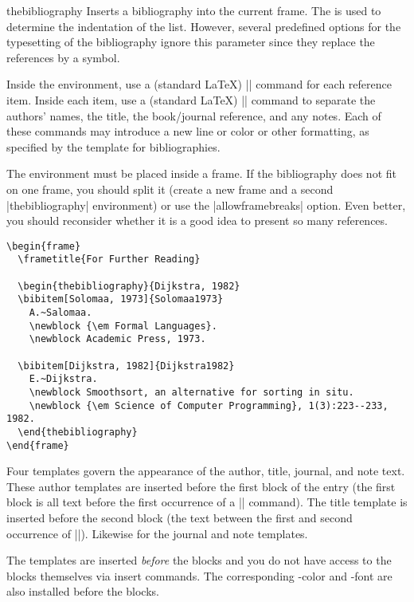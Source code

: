\begin{environment}{{thebibliography}}
  Inserts a bibliography into the current frame. The  is used to determine the indentation of the list. However,
  several predefined options for the typesetting of the bibliography
  ignore this parameter since they replace the references by a symbol.

  Inside the environment, use a (standard \LaTeX) |\bibitem| command
  for each reference item. Inside each item, use a (standard \LaTeX)
  |\newblock| command to separate the authors' names, the title, the
  book/journal reference, and any notes. Each of these commands may
  introduce a new line or color or other formatting, as specified by
  the template for bibliographies.

  The environment must be placed inside a frame. If the bibliography
  does not fit on one frame, you should
  split it (create a new frame and a second |thebibliography|
  environment) or use the |allowframebreaks| option. Even better, you
  should reconsider whether it is a good idea to present so many
  references.
  \example
\begin{verbatim}
\begin{frame}
  \frametitle{For Further Reading}

  \begin{thebibliography}{Dijkstra, 1982}
  \bibitem[Solomaa, 1973]{Solomaa1973}
    A.~Salomaa.
    \newblock {\em Formal Languages}.
    \newblock Academic Press, 1973.

  \bibitem[Dijkstra, 1982]{Dijkstra1982}
    E.~Dijkstra.
    \newblock Smoothsort, an alternative for sorting in situ.
    \newblock {\em Science of Computer Programming}, 1(3):223--233, 1982.
  \end{thebibliography}
\end{frame}
\end{verbatim}

  Four templates govern the appearance of the author, title, journal,
  and note text. These author templates are inserted before the first block
  of the entry (the first block is all text before the first occurrence of a
  |\newblock| command). The title template is inserted before
  the second block (the text between the first and second occurrence
  of |\newblock|). Likewise for the journal and note templates.

  The templates are inserted \emph{before} the blocks and you do not
  have access to the blocks themselves via insert commands. The
  corresponding \beamer-color and -font are also installed before the
  blocks.


\end{environment}
